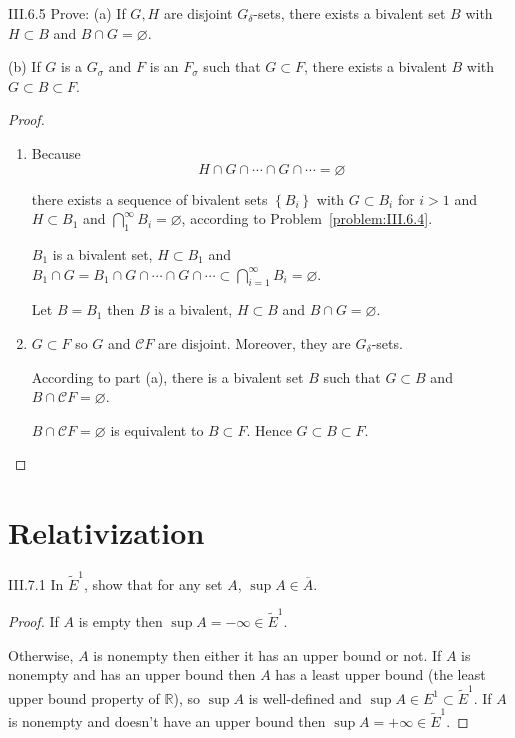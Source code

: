 \begin{problem}{III.6.5}
Prove: (a) If \(G, H\) are disjoint \(G_{\delta}\)-sets, there exists a bivalent set \(B\) with \(H \subset B\) and \( B \cap G = \varnothing \).

(b) If \(G\) is a \(G_{\sigma}\) and \(F\) is an \(F_{\sigma}\) such that \(G \subset F\), there exists a bivalent \(B\) with \( G \subset B \subset F \).
\end{problem}

\begin{proof}
	\begin{enumerate}[label={(\alph*)}]
		\item Because
		      \[
			      H \cap G \cap \cdots \cap G \cap \cdots = \varnothing
		      \]

		      there exists a sequence of bivalent sets \( \left\{ B_{i} \right\} \) with \(G \subset B_{i}\) for \(i>1\) and \(H \subset B_{1}\) and \( \bigcap^{\infty}_{1} B_{i} = \varnothing \), according to Problem~\ref{problem:III.6.4}.

		      \(B_{1}\) is a bivalent set, \( H \subset B_{1} \) and \( B_{1} \cap G = B_{1} \cap G \cap \cdots \cap G \cap \cdots \subset \bigcap^{\infty}_{i=1} B_{i} = \varnothing \).

		      Let \( B = B_{1} \) then \(B\) is a bivalent, \( H \subset B \) and \( B \cap G = \varnothing \).
		\item \( G \subset F \) so \( G \) and \( \mathscr{C}F \) are disjoint. Moreover, they are \( G_{\delta} \)-sets.

		      According to part (a), there is a bivalent set \(B\) such that \( G \subset B \) and \( B \cap \mathscr{C}F = \varnothing \).

		      \( B \cap \mathscr{C}F = \varnothing \) is equivalent to \( B \subset F \). Hence \( G \subset B \subset F \).
	\end{enumerate}
\end{proof}

\section{Relativization}

\begin{problem}{III.7.1}
In \( {\tilde{E}}^{1} \), show that for any set \(A\), \(\sup A \in \overline{A}\).
\end{problem}

\begin{proof}
	If \( A \) is empty then \( \sup A = -\infty \in \tilde{E}^{1} \).

	Otherwise, \( A \) is nonempty then either it has an upper bound or not. If \(A\) is nonempty and has an upper bound then \(A\) has a least upper bound (the least upper bound property of \(\mathbb{R}\)), so \( \sup A \) is well-defined and \( \sup A \in E^{1} \subset \tilde{E}^{1} \). If \( A \) is nonempty and doesn't have an upper bound then \( \sup A = +\infty \in \tilde{E}^{1} \).
\end{proof}

